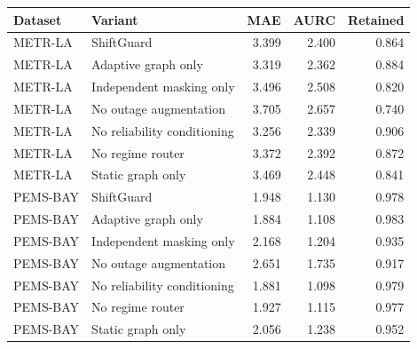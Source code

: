 \begin{tabular}{llrrr}
\toprule
Dataset & Variant & MAE & AURC & Retained \\
\midrule
METR-LA & ShiftGuard & 3.399 & 2.400 & 0.864 \\
METR-LA & Adaptive graph only & 3.319 & 2.362 & 0.884 \\
METR-LA & Independent masking only & 3.496 & 2.508 & 0.820 \\
METR-LA & No outage augmentation & 3.705 & 2.657 & 0.740 \\
METR-LA & No reliability conditioning & 3.256 & 2.339 & 0.906 \\
METR-LA & No regime router & 3.372 & 2.392 & 0.872 \\
METR-LA & Static graph only & 3.469 & 2.448 & 0.841 \\
PEMS-BAY & ShiftGuard & 1.948 & 1.130 & 0.978 \\
PEMS-BAY & Adaptive graph only & 1.884 & 1.108 & 0.983 \\
PEMS-BAY & Independent masking only & 2.168 & 1.204 & 0.935 \\
PEMS-BAY & No outage augmentation & 2.651 & 1.735 & 0.917 \\
PEMS-BAY & No reliability conditioning & 1.881 & 1.098 & 0.979 \\
PEMS-BAY & No regime router & 1.927 & 1.115 & 0.977 \\
PEMS-BAY & Static graph only & 2.056 & 1.238 & 0.952 \\
\bottomrule
\end{tabular}
